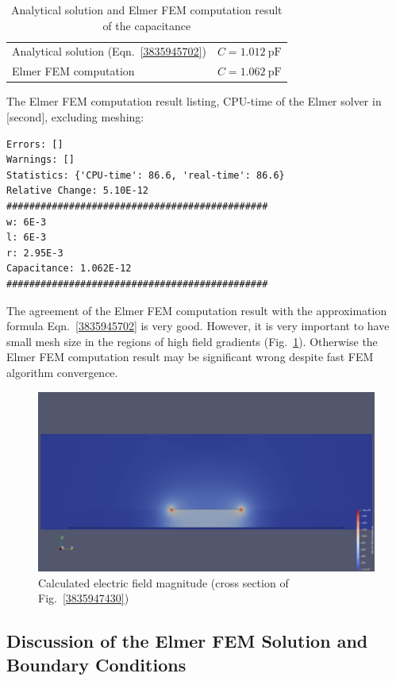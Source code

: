 \documentclass[10pt,a4paper,titlepage]{article}
\newcommand{\fig}[1]{Fig.~\ref{#1}}
\newcommand{\eqn}[1]{Eqn.~\ref{#1}}
\begin{document}
\begin{table}[H]
\centering
\begin{tabular}{ll}
Analytical solution (\eqn{3835945702}) & $C=\SI{1.012}{\pico\farad}$	\\
Elmer FEM computation & $C=\SI{1.062}{\pico\farad}$ \\
\end{tabular}
\caption{Analytical solution and Elmer FEM computation result of the capacitance}
\end{table}

\noindent
The Elmer FEM computation result listing, CPU-time of the Elmer solver in [second], excluding meshing:
\begin{verbatim}
Errors: []
Warnings: []
Statistics: {'CPU-time': 86.6, 'real-time': 86.6}
Relative Change: 5.10E-12
##############################################
w: 6E-3
l: 6E-3
r: 2.95E-3
Capacitance: 1.062E-12
##############################################
\end{verbatim}

\noindent
The agreement of the Elmer FEM computation result with the approximation formula \eqn{3835945702} is very good. However, it is very important to have small mesh size in the regions of high field gradients (\fig{3835951521}). Otherwise the Elmer FEM computation result may be significant wrong despite fast FEM algorithm convergence.

\begin{figure}[H]
	\begin{center}
		\includegraphics[width=!, height=6cm, angle=0]{./fig/e_field.png}
		\caption{Calculated electric field magnitude (cross section of \fig{3835947430})}
		\label{3835951521}
	\end{center}
\end{figure}


\subsection{Discussion of the Elmer FEM Solution and Boundary Conditions}
\end{document}
